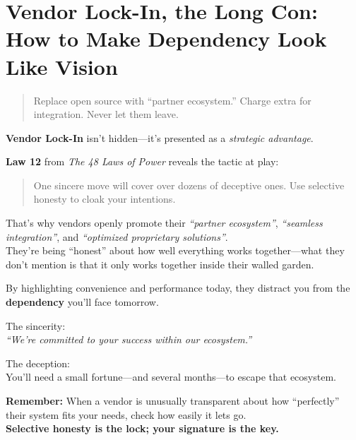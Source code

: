 \section{Vendor Lock-In, the Long Con: How to Make Dependency Look Like Vision}

\begin{quote}
Replace open source with “partner ecosystem.” Charge extra for integration. Never let them leave.
\end{quote}

  \textbf{Vendor Lock-In} isn’t hidden—it’s presented as a \textit{strategic advantage}.
  
  \medskip
  
  \textbf{Law 12} from \textit{The 48 Laws of Power} reveals the tactic at play:
  \begin{quote}
  One sincere move will cover over dozens of deceptive ones. Use selective honesty to cloak your intentions.
  \end{quote}
  
  \medskip
  
  That’s why vendors openly promote their \textit{``partner ecosystem''}, \textit{``seamless integration''}, and \textit{``optimized proprietary solutions''}. \\
  They’re being ``honest'' about how well everything works together—what they don’t mention is that it only works together inside their walled garden.
  
  \medskip
  
  By highlighting convenience and performance today, they distract you from the \textbf{dependency} you’ll face tomorrow.
  
  \medskip
  
  The sincerity: \\
  \textit{``We’re committed to your success within our ecosystem.''}
  
  \medskip
  
  The deception: \\
  You’ll need a small fortune—and several months—to escape that ecosystem.
  
  \medskip
  
  \textbf{Remember:} When a vendor is unusually transparent about how ``perfectly'' their system fits your needs, check how easily it lets go. \\
  \textbf{Selective honesty is the lock; your signature is the key.}
  
  



